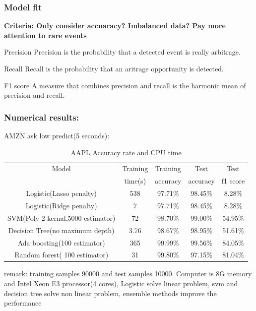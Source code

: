 \documentclass[xcolor={x11names,svgnames,dvipsnames}]{beamer}
\begin{document}
\begin{frame}
\frametitle{Model fit}
\small \textbf{Criteria: Only consider accuaracy? Imbalanced data? Pay more attention to rare events}\\
\begin{block}{Precision}
\scriptsize{Precision is the probability that a detected event is really arbitrage.}\\
\end{block}
\begin{block}{Recall}
\scriptsize{Recall is the probability that an aritrage opportunity is detected.}\\
\end{block}
\begin{block}{F1 score}
\scriptsize{A measure that combines precision and recall is the harmonic mean of precision and recall.}\\
\end{block}

\end{frame}


\begin{frame}
\frametitle{Numerical results:}

\begin{block}{AMZN ask low predict(5 seconds):}
\begin{table}[h!]\scriptsize
  \caption{AAPL Accuracy rate and CPU time}
\begin{center}
    \begin{tabular}{| c | c|c|c|c|}
    \hline

Model&	Training &	Training &	Test &	Test\\
&	time(s)&	accuracy&	accuracy&	f1 score\\
    \hline
Logistic(Lasso penalty)&	538&	97.71\%& 	98.45\%& 	8.28\%\\
Logistic(Ridge penalty)	& 7&	97.71\%& 	98.45\%& 	8.28\%\\
SVM(Poly 2 kernal,5000 estimator)&  	72& 	98.70\%& 	99.00\%&	54.95\%\\
Decision Tree(no maximum depth)&	3.76& 	98.67\%& 	98.95\%& 	51.61\% \\
Ada boosting(100 estimator)&	365& 	99.99\%& 	99.56\%& 	\alert{84.05}\%\\
Random forest( 100 estimator)&	31& 	99.80\%& 	97.15\%& 	\alert{81.04}\%\\


\hline
\end{tabular}
\end{center}
\end{table}
\end{block}
\small{remark: \alert{training samples 90000 and test samples 10000}. Computer is 8G memory and Intel Xeon E3 processor(4 cores)}, \alert{Logistic solve linear problem, svm and decision tree solve non linear problem, ensemble methods improve the performance}
\end{frame}​
\end{document}
